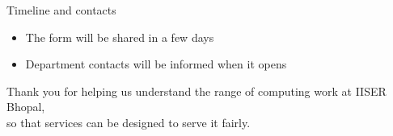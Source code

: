 \documentclass[aspectratio=169,11pt]{beamer}
\begin{document}
\begin{frame}{Timeline and contacts}
  \begin{itemize}
    \item The form will be shared in a few days
    \item Department contacts will be informed when it opens
  \end{itemize}
  \vfill
  \centering
  \textcolor{iiser}{Thank you for helping us understand the range of computing work at IISER Bhopal,\\
  so that services can be designed to serve it fairly.}
\end{frame}
\end{document}
